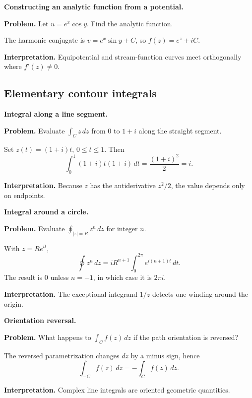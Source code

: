 \begin{workedexample}
\textbf{Constructing an analytic function from a potential.}\par
\textbf{Problem.} Let $u=e^x\cos y$. Find the analytic function.
\begin{solution}
The harmonic conjugate is $v=e^x\sin y+C$, so $f(z)=e^z+iC$.

\textbf{Interpretation.} Equipotential and stream-function curves meet orthogonally where $f'(z)\neq0$.
\end{solution}
\end{workedexample}

\subsection{Elementary contour integrals}

\begin{workedexample}
\textbf{Integral along a line segment.}\par
\textbf{Problem.} Evaluate $\int_C z\,dz$ from $0$ to $1+i$ along the straight segment.
\begin{solution}
Set $z(t)=(1+i)t$, $0\le t\le1$. Then
\[
\int_0^1 (1+i)t(1+i)\,dt=\frac{(1+i)^2}{2}=i.
\]

\textbf{Interpretation.} Because $z$ has the antiderivative $z^2/2$, the value depends only on endpoints.
\end{solution}
\end{workedexample}

\begin{workedexample}
\textbf{Integral around a circle.}\par
\textbf{Problem.} Evaluate $\oint_{|z|=R}z^n\,dz$ for integer $n$.
\begin{solution}
With $z=Re^{it}$,
\[
\oint z^n\,dz=iR^{n+1}\int_0^{2\pi}e^{i(n+1)t}\,dt.
\]
The result is $0$ unless $n=-1$, in which case it is $2\pi i$.

\textbf{Interpretation.} The exceptional integrand $1/z$ detects one winding around the origin.
\end{solution}
\end{workedexample}

\begin{workedexample}
\textbf{Orientation reversal.}\par
\textbf{Problem.} What happens to $\int_C f(z)\,dz$ if the path orientation is reversed?
\begin{solution}
The reversed parametrization changes $dz$ by a minus sign, hence
\[
\int_{-C}f(z)\,dz=-\int_Cf(z)\,dz.
\]

\textbf{Interpretation.} Complex line integrals are oriented geometric quantities.
\end{solution}
\end{workedexample}

